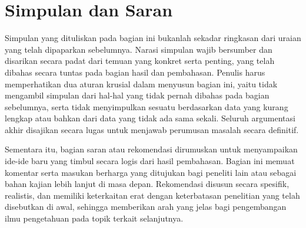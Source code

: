 %
%
\section{Simpulan dan Saran}

Simpulan yang dituliskan pada bagian ini bukanlah sekadar ringkasan dari uraian yang telah dipaparkan sebelumnya. Narasi simpulan wajib bersumber dan disarikan secara padat dari temuan yang konkret serta penting, yang telah dibahas secara tuntas pada bagian hasil dan pembahasan. Penulis harus memperhatikan dua aturan krusial dalam menyusun bagian ini, yaitu tidak mengambil simpulan dari hal-hal yang tidak pernah dibahas pada bagian sebelumnya, serta tidak menyimpulkan sesuatu berdasarkan data yang kurang lengkap atau bahkan dari data yang tidak ada sama sekali. Seluruh argumentasi akhir disajikan secara lugas untuk menjawab perumusan masalah secara definitif.

Sementara itu, bagian saran atau rekomendasi dirumuskan untuk menyampaikan ide-ide baru yang timbul secara logis dari hasil pembahasan. Bagian ini memuat komentar serta masukan berharga yang ditujukan bagi peneliti lain atau sebagai bahan kajian lebih lanjut di masa depan. Rekomendasi disusun secara spesifik, realistis, dan memiliki keterkaitan erat dengan keterbatasan penelitian yang telah disebutkan di awal, sehingga memberikan arah yang jelas bagi pengembangan ilmu pengetahuan pada topik terkait selanjutnya.